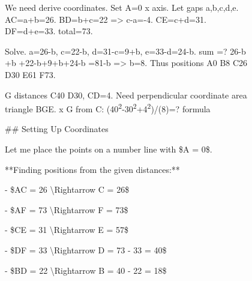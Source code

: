 \begin{figure}[H]
\begin{reasoncol}[equal height group=reasX0]
  \par\vspace{1pt}
  \caret{}\par\vspace{4pt}
  \raggedright We need derive coordinates. Set A=0 x axis. Let gaps a,b,c,d,e. AC=a+b=26. BD=b+c=22 => c-a=-4. CE=c+d=31. DF=d+e=33. total=73.\par
  Solve. a=26-b, c=22-b, d=31-c=9+b, e=33-d=24-b. sum =? 26-b +b +22-b+9+b+24-b =81-b => b=8. Thus positions A0 B8 C26 D30 E61 F73.\par
  G distances C40 D30, CD=4. Need perpendicular coordinate area triangle BGE. x G from C: (40\textsuperscript{2}-30\textsuperscript{2}+4\textsuperscript{2})/(8)=? formula\par\vspace{3pt}\elide
\end{reasoncol}
\vspace{12pt}
\noindent
\begin{answercol}[equal height group=ansX0]
  \caret{}\par\vspace{4pt}
  \raggedright \#\# Setting Up Coordinates\par\vspace{2pt}
  Let me place the points on a number line with \$A = 0\$.\par\vspace{2pt}
  **Finding positions from the given distances:**\par\vspace{2pt}
  - \$AC = 26 \textbackslash{}Rightarrow C = 26\$\par\vspace{2pt}
  - \$AF = 73 \textbackslash{}Rightarrow F = 73\$\par\vspace{2pt}
  - \$CE = 31 \textbackslash{}Rightarrow E = 57\$\par\vspace{2pt}
  - \$DF = 33 \textbackslash{}Rightarrow D = 73 - 33 = 40\$\par\vspace{2pt}
  - \$BD = 22 \textbackslash{}Rightarrow B = 40 - 22 = 18\$\par\vspace{3pt}\elide
\end{answercol}\hspace{\columnsep}%

\end{figure}
